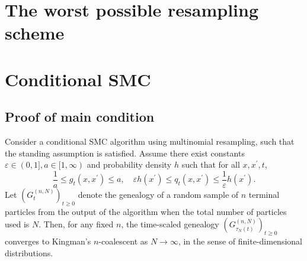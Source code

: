 \section{The worst possible resampling scheme}


\section{Conditional SMC}


\subsection{Proof of main condition}

\begin{corollary}\label{thm:CSMC_newassns}
Consider a conditional SMC algorithm using multinomial resampling, such that the standing assumption is satisfied. Assume there exist constants $\varepsilon\in (0,1], a\in [1,\infty)$ and probability density $h$ such that for all $x, x^\prime, t$,
\begin{equation}\label{eq:gq_bounds_csmc}
\frac{1}{a} \leq g_t(x, x^\prime) \leq a , \quad
\varepsilon h(x^\prime) \leq q_t(x, x^\prime) \leq \frac{1}{\varepsilon} h(x^\prime) .
\end{equation}
Let $(G_t^{(n,N)})_{t\geq0}$ denote the genealogy of a random sample of $n$ terminal particles from the output of the algorithm when the total number of particles used is $N$. Then, for any fixed $n$, the time-scaled genealogy $(G_{\tau_N(t)}^{(n,N)})_{t\geq0}$ converges to Kingman's $n$-coalescent as $N\to \infty$, in the sense of finite-dimensional distributions.
\end{corollary}

